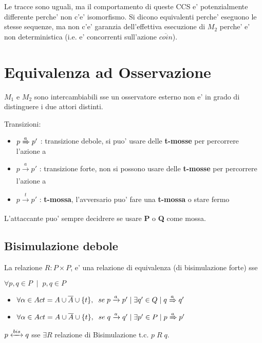 Le tracce sono uguali, ma il comportamento di queste CCS e' potenzialmente differente perche' non c'e' isomorfismo. Si dicono equivalenti perche' eseguono le stesse sequenze, ma non c'e' garanzia dell'effettiva esecuzione di $M_2$ perche' e' non deterministica (i.e. e' concorrenti sull'azione $\overline {coin}$).

\section{Equivalenza ad Osservazione}

$M_1$ e $M_2$ sono intercambiabili sse un osservatore esterno non e' in grado di distinguere i due attori distinti.

Transizioni:
\begin{itemize}
  \item $p \xRightarrow[]{a} p'$ : transizione debole, si puo' usare delle \textbf{t-mosse} per percorrere l'azione a
  \item $p \xrightarrow[]{a} p'$ : transizione forte, non si possono usare delle \textbf{t-mosse} per percorrere l'azione a
  \item $p \xrightarrow[]{t} p'$ : \textbf{t-mossa}, l'avversario puo' fare una \textbf{t-mossa} o stare fermo
\end{itemize}

  L'attaccante puo' sempre decidrere se usare \textbf{P} o \textbf{Q} come mossa.

\subsection{Bisimulazione debole}

La relazione $R : P \times P$,  e' una relazione di equivalenza (di bisimulazione forte) sse

$\forall p,q \in P \;\; | \;\; p,q \in P$ 

\begin{itemize}
  \item $\forall \alpha \in Act = A \cup \overline A \cup \{t\}, \;\; se \; p \xrightarrow[]{a} p' \; | \; \exists q' \in Q \; | \; q \xRightarrow[]{a} q'$
  \item $\forall \alpha \in Act = A \cup \overline A \cup \{t\}, \;\; se \; q \xrightarrow[]{a} q' \; | \; \exists p' \in P \; | \; p \xRightarrow[]{a} p'$
\end{itemize}

$p \xleftrightarrow[]{bis} q$ sse $\exists R$ relazione di Bisimulazione t.c. $p \; R \; q$.

